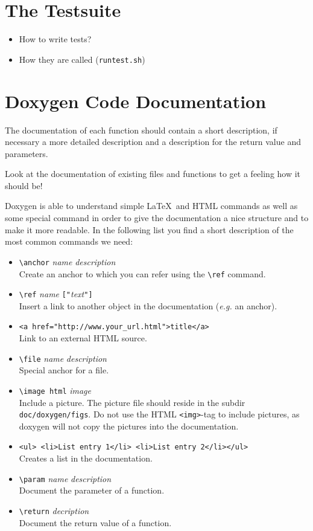 \documentclass[
a4paper,                        %
11pt,                           %
twoside,                        %
footsepline,                    %
headsepline,                    %
headexclude,                    %
footexclude,                    %
pagesize,                       %
bibtotocnumbered,               %
idxtotoc                        %
]{scrartcl}
\newcommand{\eg}{\textit{e.g.}\xspace}
\begin{document}
\section{The Testsuite}
\label{sec:testsuite}

\begin{itemize}
\item How to write tests?
\item How they are called (\texttt{runtest.sh})
\end{itemize}

\section{Doxygen Code Documentation}
\label{sec:doxygen}

The documentation of each function should contain a short description,
if necessary a more detailed description and a description for the
return value and parameters.

Look at the documentation of existing files and functions to get a
feeling how it should be!

Doxygen is able to understand simple \LaTeX\ and HTML commands as well
as some special command in order to give the documentation a nice
structure and to make it more readable. In the following list you find
a short description of the most common commands we need:

\begin{itemize}
\item \verb!\anchor! \textit{name} \textit{description}\\
  Create an anchor to which you can refer using the \verb!\ref!
  command.
\item \verb!\ref! \textit{name} \texttt{["}\textit{text}\texttt{"]}\\
  Insert a link to another object in the documentation (\eg an
  anchor).
\item \verb!<a href="http://www.your_url.html">title</a>!\\
  Link to an external HTML source.
\item \verb!\file! \textit{name} \textit{description}\\
  Special anchor for a file.
\item \verb!\image html! \textit{image}\\
  Include a picture. The picture file should reside in the subdir
  \verb!doc/doxygen/figs!. Do not use the HTML \verb!<img>!-tag to
  include pictures, as doxygen will not copy the pictures into the
  documentation.
\item \verb!<ul> <li>List entry 1</li> <li>List entry 2</li></ul>!\\
  Creates a list in the documentation.
\item \verb!\param! \textit{name} \textit{description}\\
  Document the parameter of a function.
\item \verb!\return! \textit{decription}\\
  Document the return value of a function.
\end{itemize}

\printindex
\end{document}
